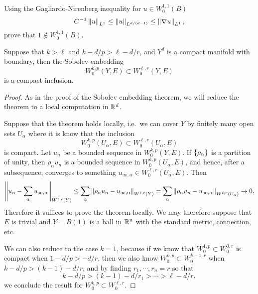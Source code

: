 \begin{xca}
  Using the Gagliardo-Nirenberg inequality for $u\in W^{1,1}_{0}(B)$
  \begin{equation*}
    C^{-1}\left\lVert u\right\rVert_{L^{1}}\le \left\lVert u\right\rVert_{L^{d/(d-1)}}\le \left\lVert\nabla u\right\rVert_{L^{1}},
  \end{equation*}
  prove that $1\not\in W^{1,1}_{0}(B)$.
\end{xca}
\begin{thm}
  Suppose that $k>\ell$ and $k-d/p>\ell-d/r$, and $Y^{d}$ is a compact manifold with boundary, then the Sobolev embedding
  \begin{equation*}
    W^{k,p}_{0}(Y,E)\subset W^{\ell,r}_{0}(Y,E)
  \end{equation*}
  is a compact inclusion.  
\end{thm}
\begin{proof}
  As in the proof of the Sobolev embedding theorem, we will reduce the theorem to a local computation in $\mathbb{R}^{d}$.

  Suppose that the theorem holds locally, i.e.\ we can cover $Y$ by finitely many open sets $U_{\alpha}$ where it is know that the inclusion
  \begin{equation*}
    W^{k,p}_{0}(U_{\alpha},E)\subset W^{\ell,r}_{0}(U_{\alpha},E)
  \end{equation*}
  is compact. Let $u_{n}$ be a bounded sequence in $W^{k,p}_{0}(Y,E)$. If $\left\{\rho_{\alpha}\right\}$ is a partition of unity, then $\rho_{\alpha}u_{n}$ is a bounded sequence in $W^{k,p}_{0}(U_{\alpha},E)$, and hence, after a subsequence, converges to something $u_{\infty,\alpha}\in W^{\ell,r}_{0}(U_{\alpha},E)$. Then
  \begin{equation*}
    \left\lVert u_{n}-\sum_{\alpha}u_{\infty,\alpha}\right\rVert_{W^{\ell,r}(Y)}\le \sum_{\alpha}\left\lVert\rho_{\alpha}u_{n}-u_{\infty,\alpha}\right\rVert_{W^{\ell,r}(Y)}=\sum_{\alpha}\left\lVert\rho_{\alpha}u_{n}-u_{\infty,\alpha}\right\rVert_{W^{\ell,r}(U_{\alpha})}\to 0.
  \end{equation*}
  Therefore it suffices to prove the theorem locally. We may therefore suppose that $E$ is trivial and $Y=B(1)$ is a ball in $\mathbb{R}^{n}$ with the standard metric, connection, etc.

  We can also reduce to the case $k=1$, because if we know that $W^{1,p}_{0}\subset W^{0,r}_{0}$ is compact when $1-d/p>-d/r$, then we also know $W^{k,p}_{0}\subset W^{k-1,r}_{0}$ when $k-d/p>(k-1)-d/r$, and by finding $r_{1},\cdots,r_{n}=r$ so that
  \begin{equation*}
    k-d/p>(k-1)-d/r_{1}>\cdots>\ell-d/r,
  \end{equation*}
  we conclude the result for $W^{k,p}_{0}\subset W^{\ell,r}_{0}$.


\end{proof}

